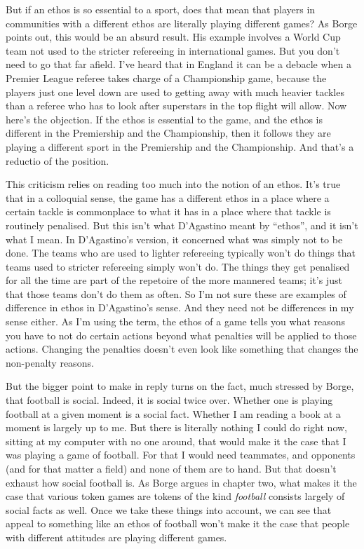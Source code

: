 \documentclass[
  11pt,
  letterpaper,
  DIV=11,
  numbers=noendperiod,
  oneside]{scrartcl}
\begin{document}
But if an ethos is so essential to a sport, does that mean that players
in communities with a different ethos are literally playing different
games? As Borge points out, this would be an absurd result. His example involves a World Cup team not used to
the stricter refereeing in international games. But you don't need to go
that far afield. I've heard that in England it can be a debacle when a
Premier League referee takes charge of a Championship game, because the
players just one level down are used to getting away with much heavier
tackles than a referee who has to look after superstars in the top
flight will allow. Now here's the objection. If the ethos is essential
to the game, and the ethos is different in the Premiership and the
Championship, then it follows they are playing a different sport in the
Premiership and the Championship. And that's a reductio of the position.

This criticism relies on reading too much into the notion of an ethos.
It's true that in a colloquial sense, the game has a different ethos in
a place where a certain tackle is commonplace to what it has in a place
where that tackle is routinely penalised. But this isn't what D'Agastino
meant by ``ethos'', and it isn't what I mean. In D'Agastino's version,
it concerned what was simply not to be done. The teams who are used to
lighter refereeing typically won't do things that teams used to stricter
refereeing simply won't do. The things they get penalised for all the
time are part of the repetoire of the more mannered teams; it's just
that those teams don't do them as often. So I'm not sure these are
examples of difference in ethos in D'Agastino's sense. And they need not
be differences in my sense either. As I'm using the term, the ethos of a
game tells you what reasons you have to not do certain actions beyond
what penalties will be applied to those actions. Changing the penalties
doesn't even look like something that changes the non-penalty reasons.

But the bigger point to make in reply turns on the fact, much stressed
by Borge, that football is social. Indeed, it is social twice over.
Whether one is playing football at a given moment is a social fact.
Whether I am reading a book at a moment is largely up to me. But there
is literally nothing I could do right now, sitting at my computer with
no one around, that would make it the case that I was playing a game of
football. For that I would need teammates, and opponents (and for that
matter a field) and none of them are to hand. But that doesn't exhaust
how social football is. As Borge argues in chapter two, what makes it
the case that various token games are tokens of the kind \emph{football}
consists largely of social facts as well. Once we take these things into
account, we can see that appeal to something like an ethos of football
won't make it the case that people with different attitudes are playing
different games.
\end{document}
